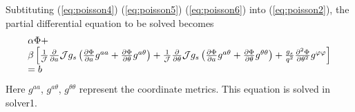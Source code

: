 \documentclass{report}
\newcommand{\ff}[2]{\frac{#1}{#2}}
\newcommand{\pp}[2]{\frac{\partial{#1}}{\partial{#2}}}
\newcommand{\psp}[2]{\frac{\partial^2{#1}}{\partial{#2}^2}}
\begin{document}
Subtituting
(\ref{eq:poisson4}) 
(\ref{eq:poisson5}) 
(\ref{eq:poisson6}) 
into
(\ref{eq:poisson2}),
the partial differential equation to be solved becomes
\begin{equation}
\label{eq:poisson7}
\begin{array}{l}
\alpha \Phi + 
\\
\beta \left[
\ff{1}{\cal J} \pp{}{a} {\cal J} g_s \left( 
           \pp{\Phi}{a} g^{a a} + \pp{\Phi}{\theta} g^{a \theta}
                        \right)
+
\ff{1}{\cal J} \pp{}{\theta} {\cal J} g_s \left( 
           \pp{\Phi}{a} g^{a \theta} + \pp{\Phi}{\theta} g^{\theta \theta}
                        \right)
+
           \ff{g_s}{q^2} \psp{\Phi}{\theta} g^{\varphi \varphi}
                    \right] 
\\
= b
\end{array}
\end{equation}
Here $g^{aa}$, $g^{a\theta}$, $g^{\theta \theta}$
represent the coordinate metrics.
This equation is solved in solver1.

\end{document}
